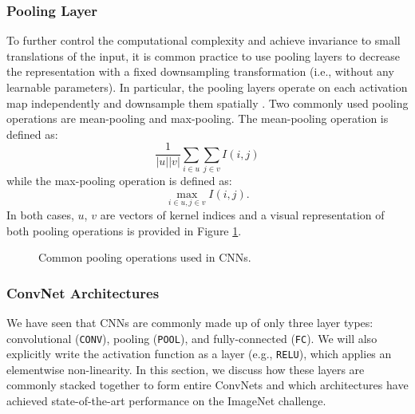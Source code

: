 \subsubsection{Pooling Layer}
To further control the computational complexity and achieve invariance to small translations of the input, it is common practice to use pooling layers to decrease the representation with a fixed downsampling transformation (i.e., without any learnable parameters). In particular, the pooling layers operate on each activation map independently and downsample them spatially \parencite{Karpathy:2016}.  Two commonly used pooling operations are mean-pooling and max-pooling. The mean-pooling operation is defined as:
\begin{equation}
\frac{1}{|u||v|}\sum_{i\in u}\sum_{j\in v}I(i,j)
\label{eq:meanpooling}
\end{equation}
while the max-pooling operation is defined as:
\begin{equation}
\max_{i\in u, j \in v} I(i, j).
\label{eq:maxpooling}
\end{equation}
In both cases, $u$, $v$ are vectors of kernel indices and a visual representation of both pooling operations is provided in Figure \ref{fig:pooling}.
\begin{figure}[H]
	\centering
	\hfill
	\caption{Common pooling operations used in \acp{CNN}.}
	\label{fig:pooling}
\end{figure}

\subsubsection{ConvNet Architectures}
We have seen that \acp{CNN} are commonly made up of only three layer types: convolutional (\texttt{CONV}), pooling (\texttt{POOL}), and fully-connected (\texttt{FC}). We will also explicitly write the activation function as a layer (e.g., \texttt{RELU}), which applies an elementwise non-linearity. In this section, we discuss how these layers are commonly stacked together to form entire ConvNets and which architectures have achieved state-of-the-art performance on the ImageNet challenge.

